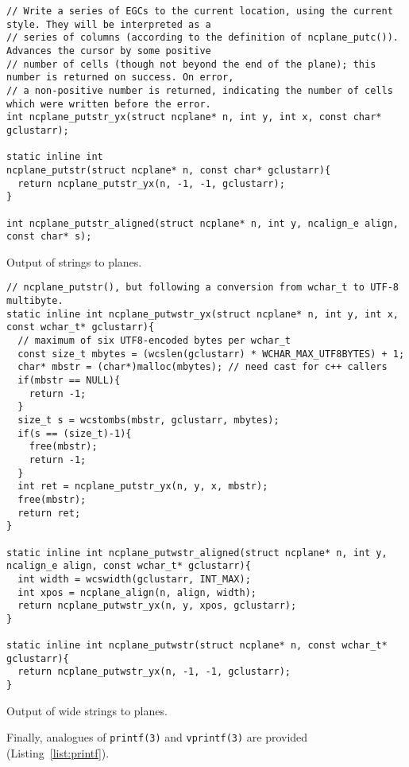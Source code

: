 \begin{listing}[!htb]
\begin{verbatim}
// Write a series of EGCs to the current location, using the current style. They will be interpreted as a
// series of columns (according to the definition of ncplane_putc()). Advances the cursor by some positive
// number of cells (though not beyond the end of the plane); this number is returned on success. On error,
// a non-positive number is returned, indicating the number of cells which were written before the error.
int ncplane_putstr_yx(struct ncplane* n, int y, int x, const char* gclustarr);

static inline int
ncplane_putstr(struct ncplane* n, const char* gclustarr){
  return ncplane_putstr_yx(n, -1, -1, gclustarr);
}

int ncplane_putstr_aligned(struct ncplane* n, int y, ncalign_e align, const char* s);
\end{verbatim}
\caption{Output of strings to planes.}
\label{list:putstr}
\end{listing}

\begin{listing}[!htb]
\begin{verbatim}
// ncplane_putstr(), but following a conversion from wchar_t to UTF-8 multibyte.
static inline int ncplane_putwstr_yx(struct ncplane* n, int y, int x, const wchar_t* gclustarr){
  // maximum of six UTF8-encoded bytes per wchar_t
  const size_t mbytes = (wcslen(gclustarr) * WCHAR_MAX_UTF8BYTES) + 1;
  char* mbstr = (char*)malloc(mbytes); // need cast for c++ callers
  if(mbstr == NULL){
    return -1;
  }
  size_t s = wcstombs(mbstr, gclustarr, mbytes);
  if(s == (size_t)-1){
    free(mbstr);
    return -1;
  }
  int ret = ncplane_putstr_yx(n, y, x, mbstr);
  free(mbstr);
  return ret;
}

static inline int ncplane_putwstr_aligned(struct ncplane* n, int y, ncalign_e align, const wchar_t* gclustarr){
  int width = wcswidth(gclustarr, INT_MAX);
  int xpos = ncplane_align(n, align, width);
  return ncplane_putwstr_yx(n, y, xpos, gclustarr);
}

static inline int ncplane_putwstr(struct ncplane* n, const wchar_t* gclustarr){
  return ncplane_putwstr_yx(n, -1, -1, gclustarr);
}
\end{verbatim}
\caption{Output of wide strings to planes.}
\label{list:wputstr}
\end{listing}

Finally, analogues of \texttt{printf(3)} and \texttt{vprintf(3)} are provided (Listing~\ref{list:printf}).

